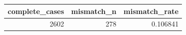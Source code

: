\begin{tabular}{rrr}
\toprule
complete\_cases & mismatch\_n & mismatch\_rate \\
\midrule
2602 & 278 & 0.106841 \\
\bottomrule
\end{tabular}
